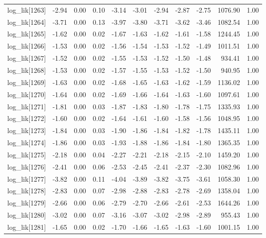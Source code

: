 \begin{table}[ht]
\begin{tabular}{rrrrrrrrrrr}
  log\_lik[1263] & -2.94 & 0.00 & 0.10 & -3.14 & -3.01 & -2.94 & -2.87 & -2.75 & 1076.90 & 1.00 \\ 
  log\_lik[1264] & -3.71 & 0.00 & 0.13 & -3.97 & -3.80 & -3.71 & -3.62 & -3.46 & 1082.54 & 1.00 \\ 
  log\_lik[1265] & -1.62 & 0.00 & 0.02 & -1.67 & -1.63 & -1.62 & -1.61 & -1.58 & 1244.45 & 1.00 \\ 
  log\_lik[1266] & -1.53 & 0.00 & 0.02 & -1.56 & -1.54 & -1.53 & -1.52 & -1.49 & 1011.51 & 1.00 \\ 
  log\_lik[1267] & -1.52 & 0.00 & 0.02 & -1.55 & -1.53 & -1.52 & -1.50 & -1.48 & 934.41 & 1.00 \\ 
  log\_lik[1268] & -1.53 & 0.00 & 0.02 & -1.57 & -1.55 & -1.53 & -1.52 & -1.50 & 940.95 & 1.00 \\ 
  log\_lik[1269] & -1.63 & 0.00 & 0.02 & -1.68 & -1.65 & -1.63 & -1.62 & -1.59 & 1136.02 & 1.00 \\ 
  log\_lik[1270] & -1.64 & 0.00 & 0.02 & -1.69 & -1.66 & -1.64 & -1.63 & -1.60 & 1097.61 & 1.00 \\ 
  log\_lik[1271] & -1.81 & 0.00 & 0.03 & -1.87 & -1.83 & -1.80 & -1.78 & -1.75 & 1335.93 & 1.00 \\ 
  log\_lik[1272] & -1.60 & 0.00 & 0.02 & -1.64 & -1.61 & -1.60 & -1.58 & -1.56 & 1048.95 & 1.00 \\ 
  log\_lik[1273] & -1.84 & 0.00 & 0.03 & -1.90 & -1.86 & -1.84 & -1.82 & -1.78 & 1435.11 & 1.00 \\ 
  log\_lik[1274] & -1.86 & 0.00 & 0.03 & -1.93 & -1.88 & -1.86 & -1.84 & -1.80 & 1365.35 & 1.00 \\ 
  log\_lik[1275] & -2.18 & 0.00 & 0.04 & -2.27 & -2.21 & -2.18 & -2.15 & -2.10 & 1459.20 & 1.00 \\ 
  log\_lik[1276] & -2.41 & 0.00 & 0.06 & -2.53 & -2.45 & -2.41 & -2.37 & -2.30 & 1082.96 & 1.00 \\ 
  log\_lik[1277] & -3.82 & 0.00 & 0.11 & -4.04 & -3.89 & -3.82 & -3.75 & -3.61 & 1058.30 & 1.00 \\ 
  log\_lik[1278] & -2.83 & 0.00 & 0.07 & -2.98 & -2.88 & -2.83 & -2.78 & -2.69 & 1358.04 & 1.00 \\ 
  log\_lik[1279] & -2.66 & 0.00 & 0.06 & -2.79 & -2.70 & -2.66 & -2.61 & -2.53 & 1644.26 & 1.00 \\ 
  log\_lik[1280] & -3.02 & 0.00 & 0.07 & -3.16 & -3.07 & -3.02 & -2.98 & -2.89 & 955.43 & 1.00 \\ 
  log\_lik[1281] & -1.65 & 0.00 & 0.02 & -1.70 & -1.66 & -1.65 & -1.63 & -1.60 & 1001.15 & 1.00 \\ 

\end{tabular}
\end{table}
